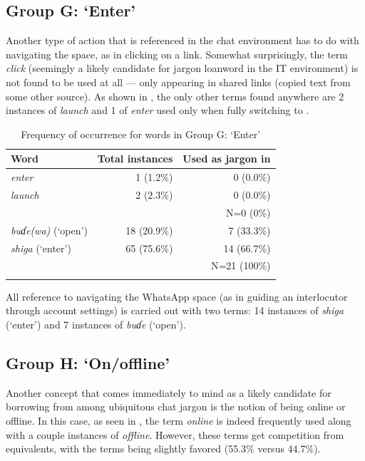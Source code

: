 \documentclass[output=paper,newtxmath,modfonts,nonflat,hidelinks]{langsci/langscibook}
\begin{document}
\subsection{Group G: ‘Enter’}

Another type of action that is referenced in the chat environment has to do with navigating the space, as in clicking on a link. Somewhat surprisingly, the  term \textit{click} (seemingly a likely candidate for jargon loanword in the IT environment) is not found to be used at all — only appearing in shared links (copied text from some other source). As shown in , the only other  terms found anywhere are 2 instances of \textit{launch} and 1 of \textit{enter} used only when fully switching to . 

\begin{table}
\begin{tabularx}{\textwidth}{Qrr}
\lsptoprule
Word & Total instances & Used as jargon in \\
\midrule
\textit{enter}  & 1 (1.2\%) & 0 (0.0\%)\\
\textit{launch} & 2 (2.3\%) & 0 (0.0\%)\\\midrule
& & N=0 (0\%)\\\midrule
\textit{buɗe(wa)} (‘open’) & 18 (20.9\%) & 7 (33.3\%)\\
\textit{shiga} (‘enter’)   & 65 (75.6\%) & 14 (66.7\%)\\\midrule
& & N=21 (100\%)\\
\lspbottomrule
\end{tabularx}
\caption{Frequency of occurrence for words in Group G: ‘Enter’}
\label{tab:purvis:9}
\end{table} 

All reference to navigating the WhatsApp space (as in guiding an interlocutor through account settings) is carried out with two  terms: 14 instances of \textit{shiga} (‘enter’) and 7 instances of \textit{buɗe} (‘open’).

\subsection{Group H: ‘On/offline’}

Another concept that comes immediately to mind as a likely candidate for borrowing from among ubiquitous  chat jargon is the notion of being online or offline. In this case, as seen in , the  term \textit{online} is indeed frequently used along with a couple instances of \textit{offline}. However, these terms get competition from  equivalents, with the  terms being slightly favored (55.3\% versus 44.7\%).
\end{document}
